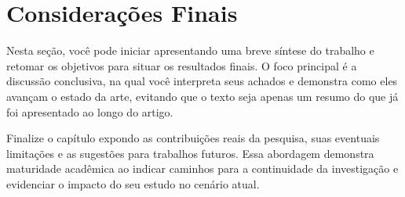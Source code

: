 
\section{Considerações Finais}
\label{sec:consideracoes}

Nesta seção, você pode iniciar apresentando uma breve síntese do trabalho e
retomar os objetivos para situar os resultados finais. O foco principal é a
discussão conclusiva, na qual você interpreta seus achados e demonstra como
eles avançam o estado da arte, evitando que o texto seja apenas um resumo do
que já foi apresentado ao longo do artigo.

Finalize o capítulo expondo as contribuições reais da pesquisa, suas eventuais
limitações e as sugestões para trabalhos futuros. Essa abordagem demonstra
maturidade acadêmica ao indicar caminhos para a continuidade da investigação
e evidenciar o impacto do seu estudo no cenário atual.